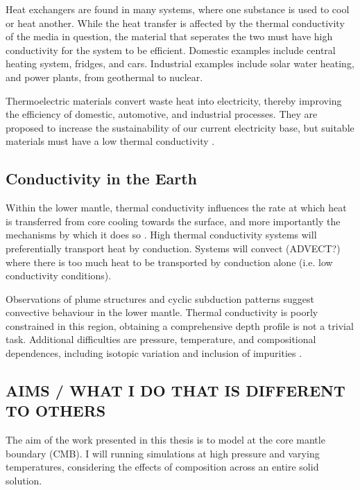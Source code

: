 Heat exchangers are found in many systems, where one substance is used to cool or heat another. While the heat transfer is affected by the thermal conductivity of the media in question, the material that seperates the two must have high conductivity for the system to be efficient. Domestic examples include central heating system, fridges, and cars. Industrial examples include solar water heating, and power plants, from geothermal to nuclear.

Thermoelectric materials convert waste heat into electricity, thereby improving the efficiency of domestic, automotive, and industrial processes. They are proposed to increase the sustainability of our current electricity base, but suitable materials must have a low thermal conductivity \citep{Snyder2008}.

\subsection{Conductivity in the Earth}

Within the lower mantle, thermal conductivity influences the rate at which heat is transferred from core cooling towards the surface, and more importantly the mechanisms by which it does so \citep{Lay2008}. High thermal conductivity systems will preferentially transport heat by conduction. Systems will convect (ADVECT?) where there is too much heat to be transported by conduction alone (i.e. low conductivity conditions).

Observations of plume structures and cyclic subduction patterns \citep[see][]{Garnero2008} suggest convective behaviour in the lower mantle. Thermal conductivity is poorly constrained in this region, obtaining a comprehensive depth profile is not a trivial task. Additional difficulties are pressure, temperature, and compositional dependences, including isotopic variation \citep{Tang2010,Dalton2013,Tang2014} and inclusion of impurities \citep{Manthilake2011,Ammann2014,Ohta2014}.

\subsection{AIMS / WHAT I DO THAT IS DIFFERENT TO OTHERS}

The aim of the work presented in this thesis is to model \tcs at the core mantle boundary (CMB). I will running simulations at high pressure and varying temperatures, considering the effects of composition across an entire solid solution. 

